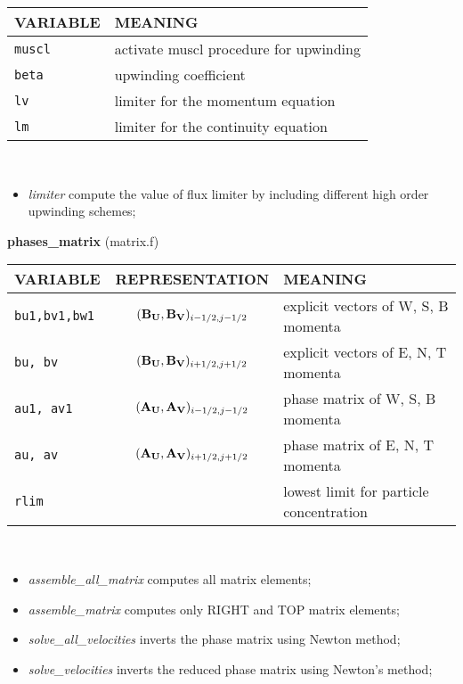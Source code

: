 \begin{tabular}{|p{6cm}|p{6cm}|}\hline
VARIABLE &  MEANING\\\hline
\tt  muscl    & activate muscl procedure for upwinding \\\hline
\tt  beta     & upwinding coefficient \\\hline
\tt  lv & limiter for the momentum equation\\\hline
\tt  lm & limiter for the continuity equation\\\hline
\end{tabular}\\
\begin{itemize}
\item{\em limiter} compute the value of flux limiter by including different high order upwinding schemes;
\end{itemize}
%
%
{\large{\bf phases\_matrix}} (matrix.f)\\[5mm]
\begin{tabular}{|p{6cm}|c|p{6cm}|}\hline
VARIABLE & REPRESENTATION & MEANING\\\hline
\tt bu1,bv1,bw1 & $({\bf B_U},{\bf B_V})_{i-1/2,j-1/2}$ & explicit vectors of W, S, B momenta\\\hline
\tt bu, bv & $({\bf B_U}, {\bf B_V})_{i+1/2,j+1/2}$ & explicit vectors of E, N, T momenta\\\hline
\tt au1, av1 &  $({\bf A_U}, {\bf A_V})_{i-1/2,j-1/2}$ & phase matrix of W, S, B momenta\\\hline
\tt au, av &  $({\bf A_U}, {\bf A_V})_{i+1/2,j+1/2}$ &phase matrix of E, N, T momenta\\\hline
\tt rlim && lowest limit for particle concentration \\\hline
\end{tabular}\\
\begin{itemize}
\item{\em assemble\_all\_matrix} computes all matrix elements;
\item{\em assemble\_matrix} computes only RIGHT and TOP matrix elements;
\item{\em solve\_all\_velocities} inverts the phase matrix using Newton method;
\item{\em solve\_velocities} inverts the reduced phase matrix using Newton's method;
\end{itemize}
%
